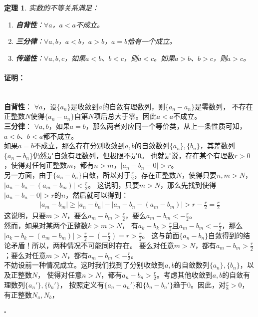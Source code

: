 \documentclass[12pt,UTF8]{ctexbook}
\newtheorem{tm}{定理}[section]
\renewenvironment{proof}{\paragraph{\textbf{证明：}}}{\hfill$\square$}
\begin{document}
\begin{appendix}
\begin{tm}\label{tm:a-1-15}
    实数的不等关系满足：
    \begin{enumerate}
        \item \textbf{自背性}：$\forall a$，$a < a$不成立。
        \item \textbf{三分律}：$\forall a, b$，$a < b$，$a > b$，$a = b$恰有一个成立。
        \item \textbf{传递性}：$\forall a, b, c$，如果$a < b$、$b < c$，则$a < c$。如果$a > b$、$b > c$，则$a > c$。
    \end{enumerate}
\end{tm}
\begin{proof}
    \mbox{} \\
    \textbf{自背性}： $\forall a$，设$\{a_n\}$是收敛到$a$的自敛有理数列，则$\{a_n - a_n\}$是零数列，
    不存在正整数$N$使得$\{a_n - a_n\}$自第$N$项后总大于零。因此$a<a$不成立。\\
    \textbf{三分律}： $\forall a, b$，如果$a = b$，那么两者对应同一个等价类，从上一条性质可知，$a<b$、$b<a$都不成立。\\
    如果$a = b$不成立，那么存在分别收敛到$a,b$的自敛数列$\{a_n\}, \{b_n\}$，其差数列$\{a_n - b_n\}$仍然是自敛有理数列，但极限不是$0$。
    也就是说，存在某个有理数$r>0$，使得对任何正整数$m$，都有$n>m$，$|a_n - b_n - 0| > r$。\\
    另一方面，由于$\{a_n - b_n\}$自敛，所以对于$\frac{r}{2}$，存在正整数$N$，使得只要$n,m>N$，$|a_n - b_n - (a_m - b_m)| < \frac{r}{2}$。
    这说明，只要$m>N$，那么先找到使得$|a_n - b_n - 0| > r$的$n$，然后就可以得到：
    \begin{align*}
        |a_m - b_m| \geqslant |a_n - b_n| - |a_n - b_n - (a_m - b_m)| > r - \frac{r}{2} = \frac{r}{2}  
    \end{align*}
    这说明，只要$m>N$，要么$a_m - b_m > \frac{r}{2}$，要么$a_m - b_m < -\frac{r}{2}$。\\
    然而，如果对某两个正整数$k>m>N$，
    有$a_k - b_k > \frac{r}{2}$且$a_m - b_m < -\frac{r}{2}$，那么$|a_k - b_k - (a_m - b_m)| > \frac{r}{2} - (-\frac{r}{2}) = r > \frac{r}{2}$。
    这与前面$\{a_n - b_n\}$自敛得到的结论矛盾！所以，两种情况不可能同时存在。
    要么对任意$m>N$，都有$a_m - b_m > \frac{r}{2}$；要么对任意$m>N$，都有$a_m - b_m < -\frac{r}{2}$。\\
    不妨设前一种情况成立。这时我们找到了分别收敛到$a,b$的自敛数列$\{a_n\}, \{b_n\}$，以及正整数$N$，
    使得对任意$n>N$，都有$a_n - b_n > \frac{r}{2}$。考虑其他收敛到$a,b$的自敛有理数列$\{a_n'\}, \{b_n'\}$，
    按照定义有$\{a_n - a_n'\}$和$\{b_n - b_n'\}$趋于$0$。因此，对$\frac{r}{8}>0$，有正整数$N_a,N_b$，

\end{proof}
\end{appendix}
\end{document}
